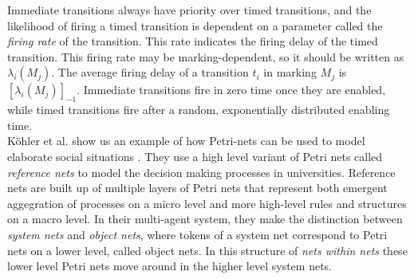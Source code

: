 \documentclass[11pt]{book}
\begin{document}
Immediate transitions always have priority over timed transitions, and  the likelihood of firing a timed transition is dependent on a parameter called the \emph{firing rate} of the transition. This rate indicates the firing delay of the timed transition. This firing rate may be marking-dependent, so it should be written as $\lambda_i(M_j)$.  The average firing delay of a transition $t_i$ in marking $M_j$ is $[\lambda_i(M_j)]_{-1}$. Immediate transitions fire in zero time once they are enabled, while timed transitions fire after a random, exponentially distributed enabling time.\\
K\"{o}hler et al. show us an example of how Petri-nets can be used to model elaborate social situations \cite{Köhler03modellingsocial}. They use a high level variant of Petri nets called \emph{reference nets} to model the decision making processes in universities. Reference nets are built up of multiple layers of Petri nets that represent both emergent aggegration of processes on a micro level and more high-level rules and structures on a macro level. In their multi-agent system, they make the distinction between \emph{system nets} and \emph{object nets}, where tokens of a system net correspond to Petri nets on a lower level, called object nets. In this structure of \emph{nets within nets} these lower level Petri nets move around in the higher level system nets. 

\end{document}
